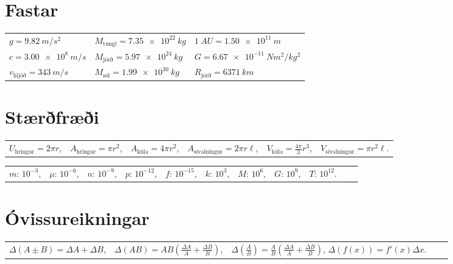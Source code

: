 \newpage

\section*{Fastar}

\begin{table}[H]
\begin{tabular}{lll}
$g = \SI{9.82}{m/s^2}$ & $M_{\text{tungl}} = \SI{7.35e22}{kg}$ & $\SI{1}{AU} = \SI{1.50e11}{m}$  \\
$c = \SI{3.00e8}{m/s}$         & $M_{\text{jörð}} = \SI{5.97e24}{kg}$  & $G = \SI{6.67e-11}{Nm^2/kg^2}$ \\
$v_{\text{hljóð}} =   \SI{343}{m/s}$ & $M_{\text{sól}} = \SI{1.99e30}{kg}$  & 
$R_{\text{jörð}} = \SI{6371}{km}$
\end{tabular}
\end{table}

\section*{Stærðfræði}

\begin{table}[H]
\begin{tabular}{llllll}
$U_{\text{hringur}} = 2\pi r$,  & $A_{\text{hringur}} = \pi r^2$, & $A_{\text{kúla}} = 4\pi r^2$, & $A_{\text{sívalningur}} = 2\pi r \ell$, & $V_{\text{kúla}} = \frac{4\pi}{3}r^3$, & $V_{\text{sívalningur}} = \pi r^2 \ell$.
\end{tabular}
\end{table}

\begin{table}[H]
\begin{tabular}{lllllllllll}
$m$: $10^{-3}$,  & $\mu$: $10^{-6}$, & $n$: $10^{-9}$, & $p$: $10^{-12}$, & $f$: $10^{-15}$, & $k$: $10^3$, & $M$: $10^6$, & $G$: $10^9$, & $T$: $10^{12}$.
\end{tabular}
\end{table}


\section*{Óvissureikningar}

\begin{table}[H]
\begin{tabular}{lllll}
$\Delta\left(A \pm B \right) = \Delta A + \Delta B$, & $\Delta \left( AB \right) = AB\left( \frac{\Delta A}{A} + \frac{\Delta B}{B} \right)$, & $\Delta \left( \frac{A}{B} \right) = \frac{A}{B}\left( \frac{\Delta A}{A} + \frac{\Delta B}{B} \right)$, $\Delta(f(x)) = f'(x) \Delta x$.
\end{tabular}
\end{table}



